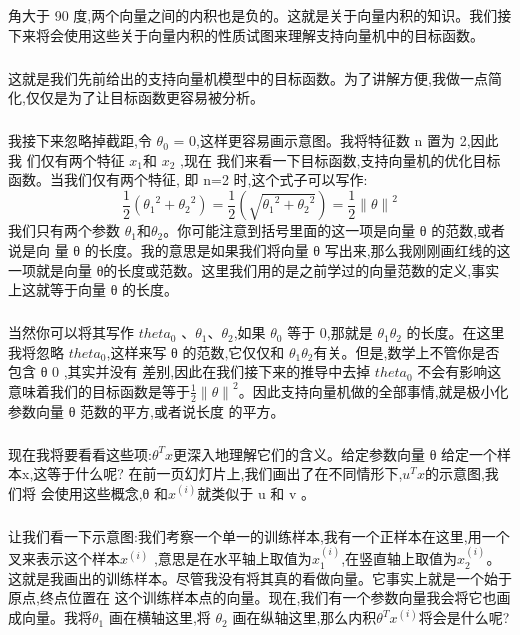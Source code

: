 \documentclass{article}
\begin{document}
\begin{CJK}{UTF8}{gbsn}
角大于 90 度,两个向量之间的内积也是负的。这就是关于向量内积的知识。我们接下来将会使用这些关于向量内积的性质试图来理解支持向量机中的目标函数。
\begin{figure}[H]
\label{fig:716}
\end{figure}
\subparagraph{}
这就是我们先前给出的支持向量机模型中的目标函数。为了讲解方便,我做一点简化,仅仅是为了让目标函数更容易被分析。
\begin{figure}[H]
\label{fig:718}
\end{figure}
\subparagraph{}
我接下来忽略掉截距,令 $\theta_0$ = 0,这样更容易画示意图。我将特征数 n 置为 2,因此我
们仅有两个特征 $x_1$和 $x_2$ ,现在 我们来看一下目标函数,支持向量机的优化目标函数。当我们仅有两个特征,
即 n=2 时,这个式子可以写作:
\begin{equation}
\frac{1}{2}({\theta_1}^2+{\theta_2}^2)=\frac{1}{2}(\sqrt{{\theta_1}^2+{\theta_2}^2})=\frac{1}{2}{\parallel{\theta}\parallel}^2
\end{equation}
我们只有两个参数 $\theta_1$和$\theta_2$。你可能注意到括号里面的这一项是向量 θ 的范数,或者说是向
量 θ 的长度。我的意思是如果我们将向量 θ 写出来,那么我刚刚画红线的这一项就是向量 θ的长度或范数。这里我们用的是之前学过的向量范数的定义,事实上这就等于向量 θ 的长度。
\subparagraph{}
当然你可以将其写作 $theta_0$ 、$\theta_1$、$\theta_2$,如果 $\theta_0$ 等于 0,那就是 $\theta_1\theta_2$ 的长度。在这里我将忽略
$theta_0$,这样来写 θ 的范数,它仅仅和  $\theta_1\theta_2$有关。但是,数学上不管你是否包含 θ 0 ,其实并没有
差别,因此在我们接下来的推导中去掉 $theta_0$ 不会有影响这意味着我们的目标函数是等于$\frac{1}{2}{\parallel{\theta}\parallel}^2$。因此支持向量机做的全部事情,就是极小化参数向量 θ 范数的平方,或者说长度
的平方。
\subparagraph{}
现在我将要看看这些项:$\theta^Tx$更深入地理解它们的含义。给定参数向量 θ 给定一个样本x,这等于什么呢? 在前一页幻灯片上,我们画出了在不同情形下,$u^Tx$的示意图,我们将
会使用这些概念,θ 和$x^{(i)}$就类似于 u 和 v 。
\begin{figure}[H]
\label{fig:720}
\end{figure}
\subparagraph{}
让我们看一下示意图:我们考察一个单一的训练样本,我有一个正样本在这里,用一个叉来表示这个样本$x^{(i)}$ ,意思是在水平轴上取值为$x_1^{(i)}$,在竖直轴上取值为$x_2^{(i)}$。这就是我画出的训练样本。尽管我没有将其真的看做向量。它事实上就是一个始于原点,终点位置在
这个训练样本点的向量。现在,我们有一个参数向量我会将它也画成向量。我将$\theta_1$ 画在横轴这里,将 $\theta_2$ 画在纵轴这里,那么内积$\theta^Tx^{(i)}$将会是什么呢?

\end{CJK}
\end{document}
